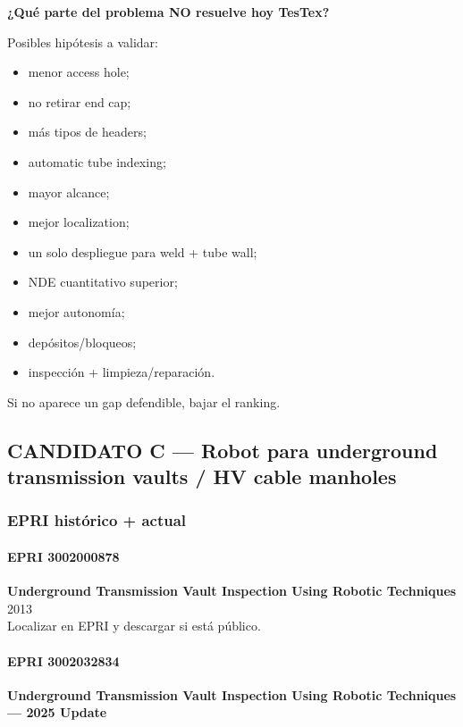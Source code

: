 \documentclass[11pt,a4paper]{article}
\begin{document}
\textbf{¿Qué parte del problema NO resuelve hoy TesTex?}

Posibles hipótesis a validar:

\begin{itemize}
\item menor access hole;
\item no retirar end cap;
\item más tipos de headers;
\item automatic tube indexing;
\item mayor alcance;
\item mejor localization;
\item un solo despliegue para weld + tube wall;
\item NDE cuantitativo superior;
\item mejor autonomía;
\item depósitos/bloqueos;
\item inspección + limpieza/reparación.
\end{itemize}

Si no aparece un gap defendible, bajar el ranking.


\subsection*{CANDIDATO C — Robot para underground transmission vaults / HV cable manholes}

\subsubsection*{EPRI histórico + actual}

\paragraph*{EPRI 3002000878}
\textbf{Underground Transmission Vault Inspection Using Robotic Techniques} \\
2013 \\
Localizar en EPRI y descargar si está público.


\paragraph*{EPRI 3002032834}
\textbf{Underground Transmission Vault Inspection Using Robotic Techniques — 2025 Update}
\end{document}
